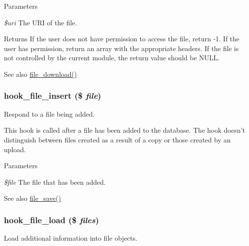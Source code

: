 \begin{DoxyParams}{Parameters}
\item[{\em \$uri}]The URI of the file. \end{DoxyParams}
\begin{DoxyReturn}{Returns}
If the user does not have permission to access the file, return -\/1. If the user has permission, return an array with the appropriate headers. If the file is not controlled by the current module, the return value should be NULL.
\end{DoxyReturn}
\begin{DoxySeeAlso}{See also}
\hyperlink{group__file_ga91226299fab7e95a673f6461bbc19b02}{file\_\-download()} 
\end{DoxySeeAlso}
\hypertarget{group__hooks_gac40fa27583fc4cba927f486098eaa79b}{
\subsubsection[{hook\_\-file\_\-insert}]{\setlength{\rightskip}{0pt plus 5cm}hook\_\-file\_\-insert (\$ {\em file})}}
\label{group__hooks_gac40fa27583fc4cba927f486098eaa79b}
Respond to a file being added.

This hook is called after a file has been added to the database. The hook doesn't distinguish between files created as a result of a copy or those created by an upload.


\begin{DoxyParams}{Parameters}
\item[{\em \$file}]The file that has been added.\end{DoxyParams}
\begin{DoxySeeAlso}{See also}
\hyperlink{group__file_ga80327cb23d8d384b827b2637cd8cc4ba}{file\_\-save()} 
\end{DoxySeeAlso}
\hypertarget{group__hooks_ga9f6bf6919600b83a565421f6a7faf678}{
\subsubsection[{hook\_\-file\_\-load}]{\setlength{\rightskip}{0pt plus 5cm}hook\_\-file\_\-load (\$ {\em files})}}
\label{group__hooks_ga9f6bf6919600b83a565421f6a7faf678}
Load additional information into file objects.

